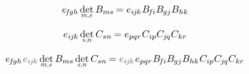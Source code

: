 \begin{otherlanguage}{russian}
\[
e_{\hspace{-0.25ex}f\hspace{-0.2ex}gh} \hspace{.33ex} \underset{\raisebox{.15em}{\scalebox{0.7}{$m$,$s$}}}{\operatorname{det}} \, B_{ms} \hspace{-0.2ex}
= e_{i\hspace{-0.1ex}j\hspace{-0.1ex}k} \hspace{.1ex} B_{\hspace{-0.25ex}f\hspace{-0.1ex}i} B_{\hspace{-0.1ex}gj} B_{hk}
\hspace{-0.2ex}
\]

\[
e_{i\hspace{-0.1ex}j\hspace{-0.1ex}k} \hspace{.33ex} \underset{\raisebox{.15em}{\scalebox{0.7}{$s$,$n$}}}{\operatorname{det}} \, C_{sn} \hspace{-0.2ex}
= e_{pqr} \hspace{.1ex} C_{ip} C_{\hspace{-0.1ex}j\hspace{-0.1ex}q} C_{kr}
\hspace{-0.2ex}
\]

\[
e_{\hspace{-0.25ex}f\hspace{-0.2ex}gh} \hspace{.2ex} \mathcolor{black!66}{e_{i\hspace{-0.1ex}j\hspace{-0.1ex}k}} \hspace{.33ex} \underset{\raisebox{.15em}{\scalebox{0.7}{$m$,$s$}}}{\operatorname{det}} \, B_{ms} \hspace{.33ex} \underset{\raisebox{.15em}{\scalebox{0.7}{$s$,$n$}}}{\operatorname{det}} \, C_{sn} \hspace{-0.2ex}
= \mathcolor{black!66}{e_{i\hspace{-0.1ex}j\hspace{-0.1ex}k}} \hspace{.2ex} e_{pqr} \hspace{.1ex} B_{\hspace{-0.25ex}f\hspace{-0.1ex}i} B_{\hspace{-0.1ex}gj} B_{hk} \hspace{.1ex} C_{ip} C_{\hspace{-0.1ex}j\hspace{-0.1ex}q} C_{kr}
\hspace{-0.2ex}
\]


\end{otherlanguage}
